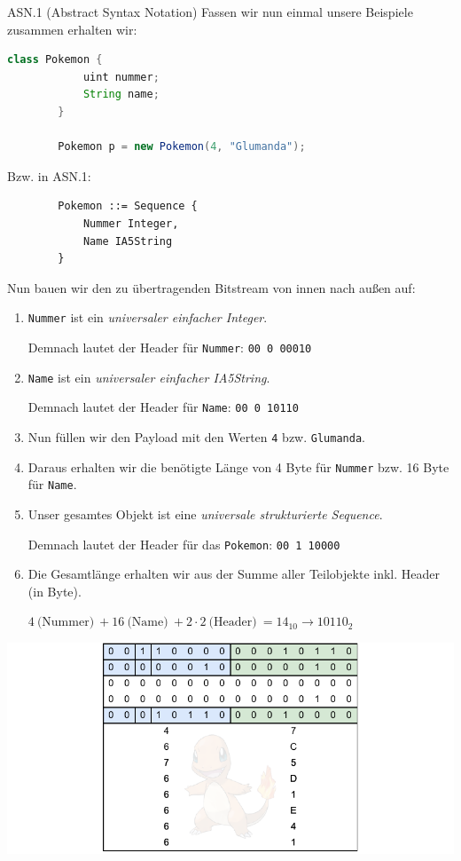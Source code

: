 \begin{example}{ASN.1 (Abstract Syntax Notation)}
    Fassen wir nun einmal unsere Beispiele zusammen erhalten wir:

    \begin{lstlisting}[language=java]
        class Pokemon {
            uint nummer;
            String name;
        }

        Pokemon p = new Pokemon(4, "Glumanda");
    \end{lstlisting}

    Bzw. in ASN.1:

    \begin{lstlisting}
        Pokemon ::= Sequence {
            Nummer Integer,
            Name IA5String
        }
    \end{lstlisting}

    Nun bauen wir den zu übertragenden Bitstream von innen nach außen auf:

    \begin{enumerate}
        \item \texttt{Nummer} ist ein \emph{universaler einfacher Integer}.

              Demnach lautet der Header für \texttt{Nummer}: \texttt{00 0 00010}
        \item \texttt{Name} ist ein \emph{universaler einfacher IA5String}.

              Demnach lautet der Header für \texttt{Name}: \texttt{00 0 10110}
        \item Nun füllen wir den Payload mit den Werten \texttt{4} bzw. \texttt{Glumanda}.
        \item Daraus erhalten wir die benötigte Länge von 4 Byte für \texttt{Nummer} bzw. 16 Byte für \texttt{Name}.
        \item Unser gesamtes Objekt ist eine \emph{universale strukturierte Sequence}.

              Demnach lautet der Header für das \texttt{Pokemon}: \texttt{00 1 10000}
        \item Die Gesamtlänge erhalten wir aus der Summe aller Teilobjekte inkl. Header (in Byte).

              $4 \ \text{(Nummer)} \ + 16 \ \text{(Name)} \ + 2 \cdot 2 \ \text{(Header)} \ = 14_{10} \to 10110_2$
    \end{enumerate}

    \includegraphics[width=\textwidth]{includes/figures/example_asn1.pdf}
\end{example}

